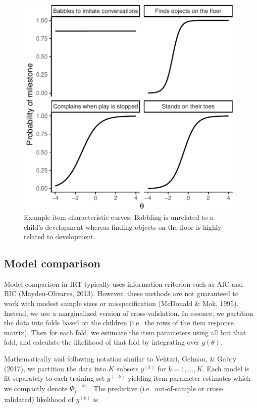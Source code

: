 \documentclass[10pt, letterpaper]{article}
\newenvironment{CodeChunk}{}{}
\begin{document}
\begin{CodeChunk}
\begin{figure}[tb]
\includegraphics{figs/icc-1} \caption[Example item characteristic curves]{Example item characteristic curves. Babbling is unrelated to a child's development whereas finding objects on the floor is highly related to development.}\label{fig:icc}
\end{figure}
\end{CodeChunk}

\hypertarget{modelcompare}{%
\subsection{Model comparison}\label{modelcompare}}

Model comparison in IRT typically uses information criterion such as AIC
and BIC (Maydeu-Olivares, 2013). However, these methods are not
guaranteed to work with modest sample sizes or misspecification
(McDonald \& Mok, 1995). Instead, we use a marginalized version of
cross-validation. In essence, we partition the data into folds based on
the children (i.e.~the rows of the item response matrix). Then for each
fold, we estimate the item parameters using all but that fold, and
calculate the likelihood of that fold by integrating over \(g(\theta)\).

Mathematically and following notation similar to Vehtari, Gelman, \&
Gabry (2017), we partition the data into \(K\) subsets \(y^{(k)}\) for
\(k = 1, \dots, K\). Each model is fit separately to each training set
\(y^{(-k)}\) yielding item parameter estimates which we compactly denote
\(\Psi_j^{(-k)}\). The predictive (i.e.~out-of-sample or
cross-validated) likelihood of \(y^{(k)}\) is
\end{document}
